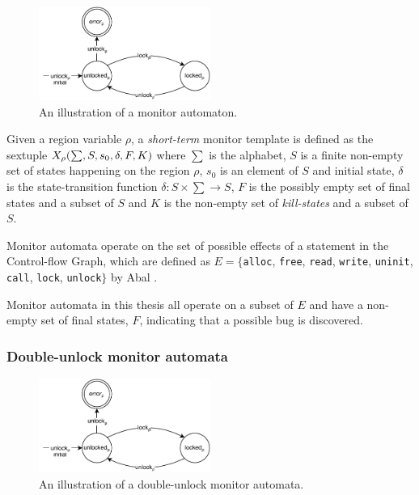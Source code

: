 \begin{figure}[H]
    \centering
    \includegraphics[width=0.5\textwidth]{background/figures/double-unlock}
    \caption{An illustration of a monitor automaton.}
    \label{double-unlock-automata-intro}
\end{figure}

\newpar Given a region variable $\rho$, a \textit{short-term} monitor template is defined as the sextuple $X_\rho (\sum, S, s_0, \delta, \\F, K)$ where $\sum$ is the alphabet, $S$ is a finite non-empty set of states happening on the region $\rho$, $s_0$ is an element of $S$ and initial state, $\delta$ is the state-transition function $\delta: S \times \sum \rightarrow S$, $F$ is the possibly empty set of final states and a subset of $S$ and $K$ is the non-empty set of \textit{kill-states} and a subset of $S$.

\newpar Monitor automata operate on the set of possible effects of a statement in the Control-flow Graph, which are defined as $E = \{$\texttt{alloc}, \texttt{free}, \texttt{read}, \texttt{write}, \texttt{uninit}, \texttt{call}, \texttt{lock}, \texttt{unlock}$\}$ by Abal \cite{EffectiveBugFinding}. 

\newpar Monitor automata in this thesis all operate on a subset of $E$ and have a non-empty set of final states, $F$, indicating that a possible bug is discovered.  

\subsubsection{Double-unlock monitor automata}

\begin{figure}[H]
    \centering
    \includegraphics[width=0.5\textwidth]{background/figures/double-unlock}
    \caption{An illustration of a double-unlock monitor automata.}
    \label{double-unlock-automata}
\end{figure}


